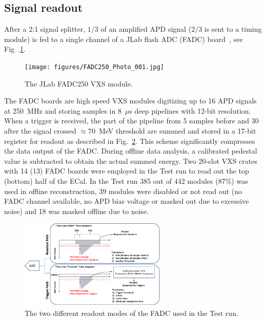 \documentclass[final,3p,times,twocolumn]{elsarticle}
\begin{document}
\subsection{Signal readout}
\label{sec:fadc}
After a 2:1 signal splitter, $1/3$ of an amplified APD signal ($2/3$ is sent to a timing module) is fed to a 
single channel of a JLab flash ADC (FADC) board~\cite{fadc}, 
see Fig~.\ref{fig:fadc}.
\begin{figure}[]
\begin{center}
{\small
\texttt{[image: figures/FADC250\_Photo\_001.jpg]}
\caption{The JLab FADC250 VXS module.}
\label{fig:fadc}
}
\end{center}
\end{figure}
The FADC boards are high speed VXS modules digitizing up to 16 APD signals 
at 250~MHz and storing samples in 8~$\mu$s deep pipelines with 12-bit resolution. 
When a trigger is received, the part 
of the pipeline from 5 samples before and 30 after the signal crossed $\approx70$~MeV threshold are 
summed and stored in a 17-bit register for readout as described in Fig.~\ref{fig:hps_trigger_data}.
This scheme significantly compresses the data output of the FADC. During offline data analysis, a 
calibrated pedestal value is subtracted to obtain the actual summed energy.
Two 20-slot VXS crates with 14 (13) FADC boards were employed in the Test run to read out the top 
(bottom) half of the ECal.
In the Test run 385 out of 442 modules (87\%) was used in offline reconstruction, 39 modules were 
disabled or not read out (no FADC channel available, no APD bias voltage or masked out due to 
excessive noise) and 18 was masked offline due to noise. 
\begin{figure}[]
\begin{center}
{\small
\includegraphics[width=7cm]{figures/fadc_datapath_diagram.png}
\caption{The two different readout modes of the FADC used in the Test run.}
\label{fig:hps_trigger_data}
}
\end{center}
\end{figure}


\end{document}

